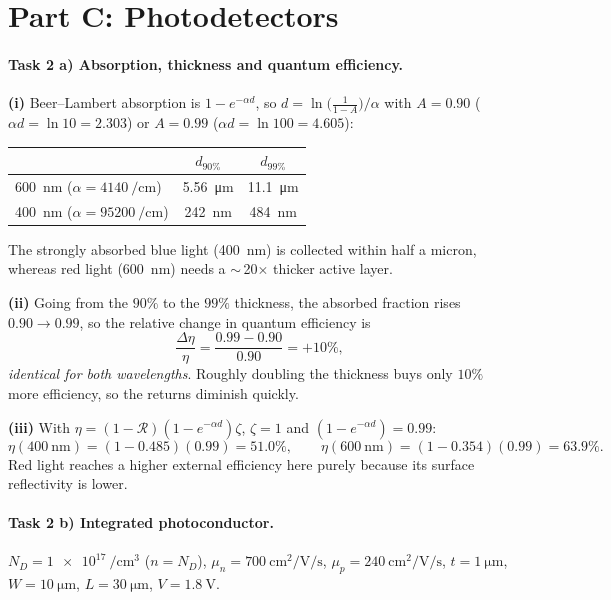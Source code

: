 \section*{Part C: Photodetectors}

\paragraph{Task 2 a) Absorption, thickness and quantum efficiency.}
\textbf{(i)} Beer--Lambert absorption is $1-e^{-\alpha d}$, so $d=\ln\!\big(\tfrac{1}{1-A}\big)/\alpha$
with $A=0.90$ ($\alpha d=\ln10=2.303$) or $A=0.99$ ($\alpha d=\ln100=4.605$):

\begin{center}\small
\begin{tabular}{lcc}
\toprule
& $d_{90\%}$ & $d_{99\%}$ \\
\midrule
\SI{600}{\nm} ($\alpha=\SI{4140}{\per\cm}$)   & \SI{5.56}{\micro\meter} & \SI{11.1}{\micro\meter} \\
\SI{400}{\nm} ($\alpha=\SI{95200}{\per\cm}$)  & \SI{242}{\nm}           & \SI{484}{\nm} \\
\bottomrule
\end{tabular}
\end{center}
The strongly absorbed blue light (\SI{400}{\nm}) is collected within half a micron, whereas red
light (\SI{600}{\nm}) needs a $\sim$\,20$\times$ thicker active layer.

\textbf{(ii)} Going from the $90\%$ to the $99\%$ thickness, the absorbed fraction rises $0.90\to0.99$,
so the relative change in quantum efficiency is
\[
\frac{\Delta\eta}{\eta}=\frac{0.99-0.90}{0.90}=+10\%,
\]
\emph{identical for both wavelengths}. Roughly doubling the thickness buys only $10\%$ more
efficiency, so the returns diminish quickly.

\textbf{(iii)} With $\eta=(1-\mathcal R)(1-e^{-\alpha d})\zeta$, $\zeta=1$ and $(1-e^{-\alpha d})=0.99$:
\[
\eta(\SI{400}{\nm})=(1-0.485)(0.99)=\mathbf{51.0\%},\qquad
\eta(\SI{600}{\nm})=(1-0.354)(0.99)=\mathbf{63.9\%}.
\]
Red light reaches a higher external efficiency here purely because its surface reflectivity is lower.

\paragraph{Task 2 b) Integrated photoconductor.}
$N_D=\SI{1e17}{\per\cubic\cm}$ ($n=N_D$), $\mu_n=\SI{700}{\square\cm\per\volt\per\second}$,
$\mu_p=\SI{240}{\square\cm\per\volt\per\second}$, $t=\SI{1}{\micro\meter}$, $W=\SI{10}{\micro\meter}$,
$L=\SI{30}{\micro\meter}$, $V=\SI{1.8}{\volt}$.

